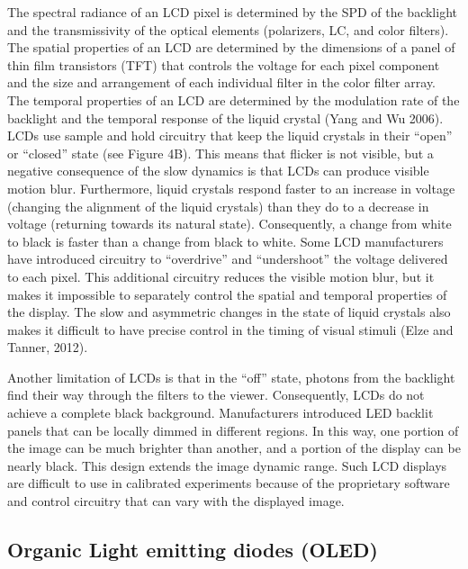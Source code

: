 \documentclass[
  letterpaper,
]{book}
\begin{document}
The spectral radiance of an LCD pixel is determined by the SPD of the
backlight and the transmissivity of the optical elements (polarizers,
LC, and color filters). The spatial properties of an LCD are determined
by the dimensions of a panel of thin film transistors (TFT) that
controls the voltage for each pixel component and the size and
arrangement of each individual filter in the color filter array. The
temporal properties of an LCD are determined by the modulation rate of
the backlight and the temporal response of the liquid crystal (Yang and
Wu 2006). LCDs use sample and hold circuitry that keep the liquid
crystals in their ``open'' or ``closed'' state (see Figure 4B). This
means that flicker is not visible, but a negative consequence of the
slow dynamics is that LCDs can produce visible motion blur. Furthermore,
liquid crystals respond faster to an increase in voltage (changing the
alignment of the liquid crystals) than they do to a decrease in voltage
(returning towards its natural state). Consequently, a change from white
to black is faster than a change from black to white. Some LCD
manufacturers have introduced circuitry to ``overdrive'' and
``undershoot'' the voltage delivered to each pixel. This additional
circuitry reduces the visible motion blur, but it makes it impossible to
separately control the spatial and temporal properties of the display.
The slow and asymmetric changes in the state of liquid crystals also
makes it difficult to have precise control in the timing of visual
stimuli (Elze and Tanner, 2012).

Another limitation of LCDs is that in the ``off'' state, photons from
the backlight find their way through the filters to the viewer.
Consequently, LCDs do not achieve a complete black background.
Manufacturers introduced LED backlit panels that can be locally dimmed
in different regions. In this way, one portion of the image can be much
brighter than another, and a portion of the display can be nearly black.
This design extends the image dynamic range. Such LCD displays are
difficult to use in calibrated experiments because of the proprietary
software and control circuitry that can vary with the displayed image.

\subsection{\texorpdfstring{\textbf{Organic Light emitting diodes
(OLED)}}{Organic Light emitting diodes (OLED)}}\label{organic-light-emitting-diodes-oled}
\end{document}
